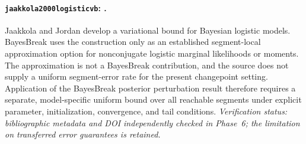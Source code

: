 \paragraph{\texttt{jaakkola2000logisticvb}: \citet{jaakkola2000logisticvb}.}
Jaakkola and Jordan develop a variational bound for Bayesian logistic models. BayesBreak uses the construction only as an established segment-local approximation option for nonconjugate logistic marginal likelihoods or moments. The approximation is not a BayesBreak contribution, and the source does not supply a uniform segment-error rate for the present changepoint setting. Application of the BayesBreak posterior perturbation result therefore requires a separate, model-specific uniform bound over all reachable segments under explicit parameter, initialization, convergence, and tail conditions. \textit{Verification status: bibliographic metadata and DOI independently checked in Phase~6; the limitation on transferred error guarantees is retained.}
